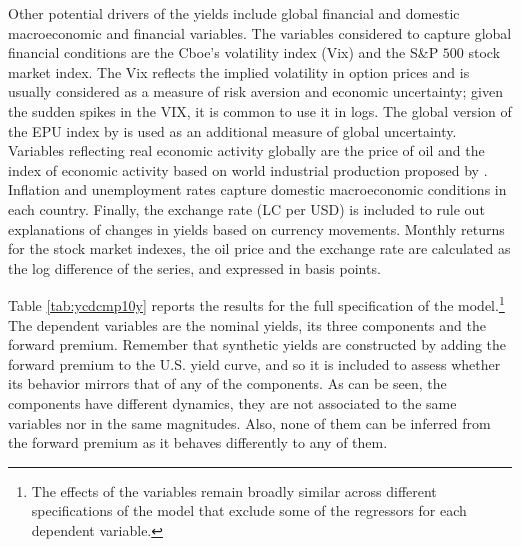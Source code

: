 {Other potential drivers of the yields include global financial and domestic macroeconomic and financial variables.
The variables considered to capture global financial conditions are the Cboe's volatility index (Vix) and the S\&P \(500\) stock market index. 
The Vix reflects the implied volatility in option prices and is usually considered as a measure of risk aversion and economic uncertainty; given the sudden spikes in the VIX, it is common to use it in logs.
The global version of the EPU index by \cite{BakerBloomDavis:2016} is used as an additional measure of global uncertainty.
Variables reflecting real economic activity globally are the price of oil and the index of economic activity based on world industrial production proposed by \cite{Hamilton:2019}.
Inflation and unemployment rates capture domestic macroeconomic conditions in each country.
Finally, the exchange rate (LC per USD) is included to rule out explanations of changes in yields based on currency movements.
Monthly returns for the stock market indexes, the oil price and the exchange rate are calculated as the log difference of the series, and expressed in basis points.

Table \ref{tab:ycdcmp10y} reports the results for the full specification of the model.\footnote{ The effects of the variables remain broadly similar across different specifications of the model that exclude some of the regressors for each dependent variable.} 
The dependent variables are the nominal yields, its three components and the forward premium.
Remember that synthetic yields are constructed by adding the forward premium to the U.S. yield curve, and so it is included to assess whether its behavior mirrors that of any of the components.
As can be seen, the components have different dynamics, they are not associated to the same variables nor in the same magnitudes.
Also, none of them can be inferred from the forward premium as it behaves differently to %
any of them.

}
